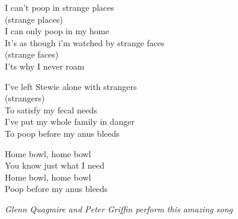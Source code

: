 \vspace{10pt}
\par
I can't poop in strange places\\
(strange places)\\
I can only poop in my home\\
It's as though i'm watched by strange faces\\
(strange faces)\\
I'ts why I never roam\par
\vspace{10pt}
I've left Stewie alone with strangers\\
(strangers)\\
To satisfy my fecal needs\\
I've put my whole family in danger\\
To poop before my anus bleeds\par
\vspace{10pt}
Home bowl, home bowl\\
You know just what I need\\
Home bowl, home bowl\\
Poop before my anus bleeds\par
\vspace{10pt}
{\footnotesize\textit{Glenn Quagmire and Peter Griffin perform this amazing song}}
